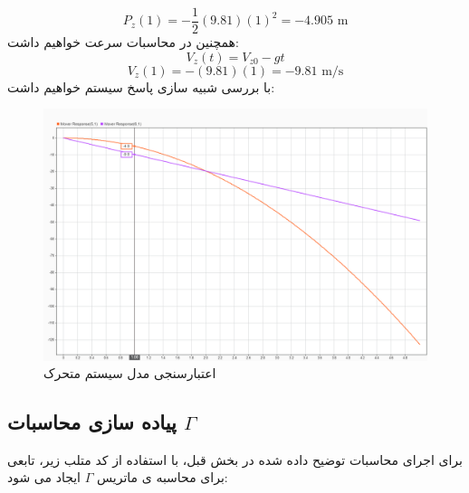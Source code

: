  \begin{equation}
 	P_z(1) = -\frac{1}{2} (9.81) (1)^2 = -4.905 \text{ m}
 \end{equation}
 همچنین در محاسبات سرعت خواهیم داشت:
 \begin{equation}
 	V_z(t) = V_{z0} - g t
 \end{equation}
 \begin{equation}
 	V_z(1) = - (9.81) (1) = -9.81 \text{ m/s}
 \end{equation}
 با بررسی شبیه سازی پاسخ سیستم خواهیم داشت:
 \begin{figure}[H]
 	\centering
 	\includegraphics[width=1\linewidth]{../img/Mover_fall_verification}
 	\caption{اعتبارسنجی مدل سیستم متحرک}
 	\label{fig:moverfallverification}
 \end{figure}
 
\subsection{پیاده سازی محاسبات $\Gamma$}
برای اجرای محاسبات توضیح داده شده در بخش قبل، با استفاده از کد متلب زیر، تابعی برای محاسبه ی ماتریس $\Gamma$ ایجاد می شود:


